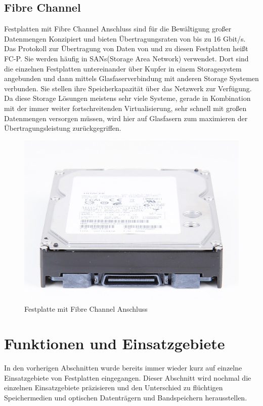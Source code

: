\documentclass[a4paper, DIV20, 12pt, headsepline, parskip, flushleft]{scrartcl}
\begin{document}
\subsection{Fibre Channel}
Festplatten mit Fibre Channel Anschluss sind für die Bewältigung großer Datenmengen Konzipiert und bieten Übertragungsraten von bis zu 16 Gbit/s. Das Protokoll zur Übertragung von Daten von und zu diesen Festplatten heißt FC-P. \newline
Sie werden häufig in SANs(Storage Area Network) verwendet. Dort sind die einzelnen Festplatten untereinander über Kupfer in einem Storagesystem angebunden und dann mittels Glasfaserverbindung mit anderen Storage Systemen verbunden. Sie stellen ihre Speicherkapazität über das Netzwerk zur Verfügung. Da diese Storage Lösungen meistens sehr viele Systeme, gerade in Kombination mit der immer weiter fortschreitenden Virtualisierung, sehr schnell mit großen Datenmengen versorgen müssen, wird hier auf Glasfasern zum maximieren der Übertragungsleistung  zurückgegriffen. 
\begin{figure}[H]
\begin{center}
\includegraphics[scale=0.18]{fibreChannel.jpg}
\end{center}
\caption{Festplatte mit Fibre Channel Anschluss \textsuperscript{\cite{img:fibre}}}
\end{figure} 
\section{Funktionen und Einsatzgebiete}
In den vorherigen Abschnitten wurde bereits immer wieder kurz auf einzelne Einsatzgebiete von Festplatten eingegangen. Dieser Abschnitt wird nochmal die einzelnen Einsatzgebiete präzisieren und den Unterschied zu flüchtigen Speichermedien und optischen Datenträgern und Bandspeichern herausstellen. \newline
\end{document}
